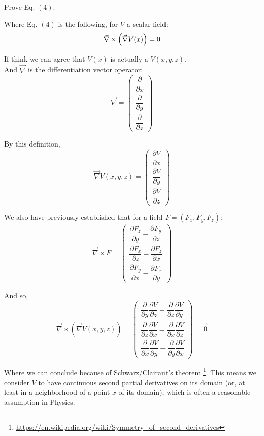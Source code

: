 \documentclass[solutions.tex]{subfiles}
\begin{document}
\maketitle
\begin{exercise}
Prove Eq. $(4)$.
\end{exercise}
Where Eq. $(4)$ is the following, for $V$ a scalar field:
\[
	\vec{\nabla}\times\Bigl(\vec\nabla V(x)\Bigr) = 0
\]

If think we can agree that $V(x)$ is actually a $V(x, y, z)$. \\

And $\vec\nabla$ is the differentiation vector operator:
\[
	\vec\nabla = \begin{pmatrix}
		\dfrac{\partial}{\partial x} \\[1em]
		\dfrac{\partial}{\partial y} \\[1em]
		\dfrac{\partial}{\partial z}
	\end{pmatrix}
\]

By this definition,
\[
	\vec\nabla V(x, y, z) = \begin{pmatrix}
		\dfrac{\partial V}{\partial x} \\[1em]
		\dfrac{\partial V}{\partial y} \\[1em]
		\dfrac{\partial V}{\partial z}
	\end{pmatrix}
\]

We also have previously established that for a field
$F = (F_x, F_y, F_z)$:
\[
	\vec\nabla\times F = \begin{pmatrix}
		\dfrac{\partial F_z}{\partial y} - \dfrac{\partial F_y}{\partial z} \\[1em]
		\dfrac{\partial F_x}{\partial z} - \dfrac{\partial F_z}{\partial x} \\[1em]
		\dfrac{\partial F_y}{\partial x} - \dfrac{\partial F_x}{\partial y}
	\end{pmatrix}
\]

And so,
\[
	\vec\nabla\times (\vec\nabla V(x, y, z)) = \begin{pmatrix}
		\dfrac{\partial }{\partial y}\dfrac{\partial V}{\partial z}
			- \dfrac{\partial}{\partial z}\dfrac{\partial V}{\partial y} \\[1em]
		\dfrac{\partial}{\partial z}\dfrac{\partial V}{\partial x}
			- \dfrac{\partial}{\partial x}\dfrac{\partial V}{\partial z} \\[1em]
		\dfrac{\partial}{\partial x}\dfrac{\partial V}{\partial y}
			- \dfrac{\partial}{\partial y}\dfrac{\partial V}{\partial x}
	\end{pmatrix} = \vec{0}
\]

Where we can conclude because of Schwarz/Clairaut's theorem
\footnote{\url{https://en.wikipedia.org/wiki/Symmetry\_of\_second\_derivatives}}.
This means we consider $V$ to have continuous second partial derivatives on
its domain (or, at least in a neighborhood of a point $x$ of its domain), which
is often a reasonable assumption in Physics.
\end{document}
